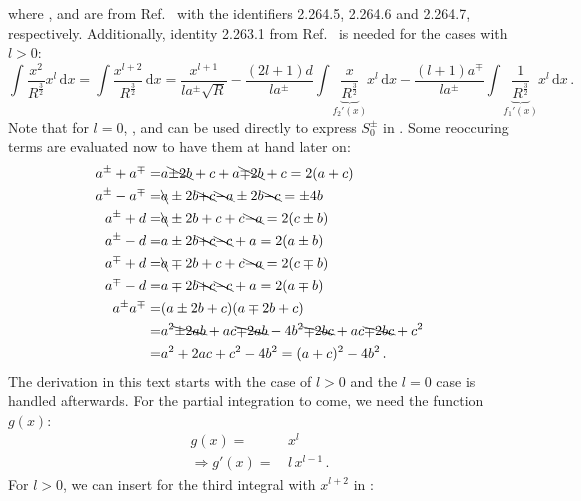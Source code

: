 where ,  and  are from Ref.~\cite{gradshteyn_ryzhik}
with the identifiers 2.264.5, 2.264.6 and 2.264.7, respectively.
Additionally, identity 2.263.1 from Ref.~\cite{gradshteyn_ryzhik} is needed for the cases with $l>0$:
\begin{equation}
    \int \frac{x^2}{R^\frac{3}{2}} x^l \,\mathrm{d}x
  = \int \frac{x^{l+2}}{R^\frac{3}{2}} \,\mathrm{d}x
  =   \frac{x^{l+1}}{l a^{\pm} \sqrt{R}}
    - \frac{(2l+1)d}{l a^{\pm}}      \int \underbrace{\frac{x}{R^\frac{3}{2}}}_{f_2'(x)} x^l \,\mathrm{d}x
    - \frac{(l+1)a^{\mp}}{l a^{\pm}} \int \underbrace{\frac{1}{R^\frac{3}{2}}}_{f_1'(x)} x^l \,\mathrm{d}x \, . \label{eqn:int_x2_r32}
\end{equation}
Note that for $l=0$, ,  and 
can be used directly to express $S^{\pm}_0$ in .
Some reoccuring terms are evaluated now to have them at hand later on:
\begin{align}
  a^{\pm} + a^{\mp} =& a \bcancel{\pm 2b} + c + a \bcancel{\mp 2b} + c = 2(a+c) \\
  a^{\pm} - a^{\mp} =& \bcancel{a} \pm 2b \bcancel{+ c} \bcancel{- a} \pm 2b \bcancel{- c} = \pm 4 b \\
  a^{\pm} + d       =& \bcancel{a} \pm 2b + c + c \bcancel{-a} = 2 (c \pm b) \\
  a^{\pm} - d       =& a \pm 2b \bcancel{+c} \bcancel{-c} + a = 2 (a \pm b) \\
  a^{\mp} + d       =& \bcancel{a} \mp 2b + c + c \bcancel{-a} = 2 (c \mp b) \\
  a^{\mp} - d       =& a \mp 2b \bcancel{+c} \bcancel{-c} + a = 2 (a \mp b) \\
  a^{\pm} a^{\mp}   =& (a \pm 2b + c)(a \mp 2b + c) \nonumber \\
        ~           =& a^2 \bcancel{\pm 2 a b} + a c \bcancel{\mp 2 a b} - 4 b^2 \bcancel{\mp 2 b c} + a c \bcancel{\mp 2 b c} + c^2 \nonumber \\
        ~           =& a^2 + 2 a c + c^2 - 4 b^2 = (a + c)^2 - 4b^2 \, .
\end{align}
The derivation in this text starts with the case of $l>0$ and the $l=0$ case is handled afterwards.
For the partial integration to come, we need the function $g(x)$:
\begin{align}
              g    (x) =&\,      x^l \\
  \Rightarrow {g'}(x) =&\, l \, x^{l-1} \, .
\end{align}
For $l>0$, we can insert  for the third integral with $x^{l+2}$ in :
